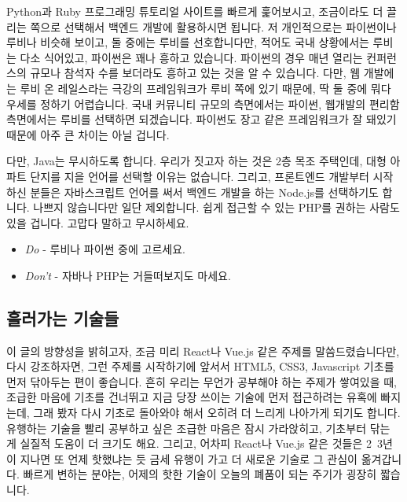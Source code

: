 \documentclass[11pt,a4paper]{article}
\begin{document}
\textsf{Python}과 \textsf{Ruby} 프로그래밍 튜토리얼 사이트를 빠르게 훑어보시고, 조금이라도 더 끌리는 쪽으로 선택해서 백엔드 개발에 활용하시면 됩니다. 저 개인적으로는 \textsf{파이썬}이나 \textsf{루비}나 비슷해 보이고, 둘 중에는 \textsf{루비}를 선호합니다만, 적어도 국내 상황에서는 \textsf{루비}는 다소 식어있고, \textsf{파이썬}은 꽤나 흥하고 있습니다. \textsf{파이썬}의 경우 매년 열리는 컨퍼런스의 규모나 참석자 수를 보더라도 흥하고 있는 것을 알 수 있습니다. 다만, 웹 개발에는 \textsf{루비 온 레일스}라는 극강의 프레임워크가 \textsf{루비} 쪽에 있기 때문에, 딱 둘 중에 뭐다 우세를 정하기 어렵습니다. 국내 커뮤니티 규모의 측면에서는 \textsf{파이썬}, 웹개발의 편리함 측면에서는 \textsf{루비}를 선택하면 되겠습니다. \textsf{파이썬}도 \textsf{장고} 같은 프레임워크가 잘 돼있기 때문에 아주 큰 차이는 아닐 겁니다.

다만, \textsf{Java}는 무시하도록 합니다. 우리가 짓고자 하는 것은 2층 목조 주택인데, 대형 아파트 단지를 지을 언어를 선택할 이유는 없습니다. 그리고, 프론트엔드 개발부터 시작하신 분들은 자바스크립트 언어를 써서 백엔드 개발을 하는 \textsf{Node.js}를 선택하기도 합니다. 나쁘지 않습니다만 일단 제외합니다. 쉽게 접근할 수 있는 \textsf{PHP}를 권하는 사람도 있을 겁니다. 고맙다 말하고 무시하세요.

\begin{itemize}
\item \emph{Do} -  루비나 파이썬 중에 고르세요.
\item \emph{Don't} - 자바나 PHP는 거들떠보지도 마세요.
\end{itemize}

\subsection{흘러가는 기술들}

이 글의 방향성을 밝히고자, 조금 미리 \textsf{React나 Vue.js} 같은 주제를 말씀드렸습니다만, 다시 강조하자면, 그런 주제를 시작하기에 앞서서 \textsf{HTML5, CSS3, Javascript} 기초를 먼저 닦아두는 편이 좋습니다. 흔히 우리는 무언가 공부해야 하는 주제가 쌓여있을 때, 조급한 마음에 기초를 건너뛰고 지금 당장 쓰이는 기술에 먼저 접근하려는 유혹에 빠지는데, 그래 봤자 다시 기초로 돌아와야 해서 오히려 더 느리게 나아가게 되기도 합니다. 유행하는 기술을 빨리 공부하고 싶은 조급한 마음은 잠시 가라앉히고, 기초부터 닦는 게 실질적 도움이 더 크기도 해요. 그리고, 어차피 \textsf{React나 Vue.js} 같은 것들은 2~3년이 지나면 또 언제 핫했냐는 듯 금세 유행이 가고 더 새로운 기술로 그 관심이 옮겨갑니다. 빠르게 변하는 분야는, 어제의 핫한 기술이 오늘의 폐품이 되는 주기가 굉장히 짧습니다.
\end{document}
